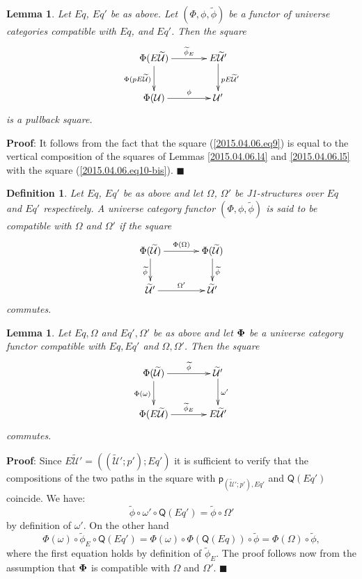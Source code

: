 \documentclass[12pt]{article}
\numberwithin{equation}{section}
\newenvironment{eq}{\begin{equation}}{\end{equation}}
\newenvironment{myproof}{{\bf Proof}:}{$\blacksquare$ \vskip 5mm }
\newtheorem{lemma}[proposition]{Lemma}
\newtheorem{definition}[proposition]{Definition}
\newcommand{\wt}{\widetilde}
\newcommand{\p}{\mathsf{p}}
\newcommand{\U}{\mathcal{U}}
\newcommand{\Q}{\mathsf{Q}}
\begin{document}
%
\begin{lemma}
\label{2015.04.06.l6} Let $Eq$, $Eq'$ be as above. Let $(\Phi,\phi,\wt{\phi})$
be a functor of universe categories compatible with $Eq$, and $Eq'$. Then the
square
%
\begin{eq}\label{2015.04.06.eq9}
\begin{xy}
          \xymatrix@C=3pc{ \Phi(E\wt{\U}) \ar[r]^-{\wt{\phi}_{E}}
            \ar[d]_{\Phi(pE\wt{\U})} & E\wt{\U}' \ar[d]^{pE\wt{\U}'}\\ \Phi(\U)
            \ar[r]^-{\phi} & \U' }
\end{xy}
\end{eq}%
%
is a pullback square.
%
\end{lemma} 
%
\begin{myproof}
It follows from the fact that the square (\ref{2015.04.06.eq9}) is equal to the
vertical composition of the squares of Lemmas \ref{2015.04.06.l4} and
\ref{2015.04.06.l5} with the square (\ref{2015.04.06.eq10-bis}).
\end{myproof}
%


\begin{definition}
\label{2015.04.06.def5} Let $Eq$, $Eq'$ be as above and let $\Omega$,
$\Omega'$ be J1-structures over $Eq$ and $Eq'$ respectively. A universe
category functor $(\Phi,\phi,\wt{\phi})$ is said to be compatible with $\Omega$
and $\Omega'$ if the square
%
$$
\begin{xy}
          \xymatrix@C=3pc{ \Phi(\wt{\U}) \ar[r]^-{\Phi(\Omega)}
            \ar[d]_{\wt{\phi}} & \Phi(\wt{\U})\ar[d]^{\wt{\phi}}\\ \wt{\U}'
            \ar[r]^-{\Omega'} & \wt{\U}' }
\end{xy}
$$
%
commutes.
\end{definition}
%
\begin{lemma}
\label{2015.04.10.l7} Let $Eq,\Omega$ and $Eq',\Omega'$ be as above and let
${\bf\Phi}$ be a universe category functor compatible with $Eq,Eq'$ and
$\Omega,\Omega'$. Then the square
%
$$
\begin{xy}
          \xymatrix@C=3pc{ \Phi(\wt{\U}) \ar[r]^-{\wt{\phi}}
            \ar[d]_{\Phi(\omega)} & \wt{\U}'\ar[d]^-{\omega'}\\ \Phi(E\wt{\U})
            \ar[r]^-{\wt{\phi}_{E}} & E\wt{\U}' }
\end{xy}
$$
%
commutes.
\end{lemma}
%
\begin{myproof}
Since $E\wt{\U}'=((\wt{\U}';p');Eq')$ it is sufficient to verify that the
compositions of the two paths in the square with $\p_{(\wt{\U}';p'),Eq'}$ and
$\Q(Eq')$ coincide. We have:
%
$$\wt{\phi}\circ\omega'\circ \Q(Eq')=\wt{\phi}\circ\Omega'$$
%
by definition of $\omega'$. On the other hand
%
$$\Phi(\omega)\circ \wt{\phi}_{E}\circ \Q(Eq')=\Phi(\omega)\circ
\Phi(\Q(Eq))\circ \wt{\phi}=\Phi(\Omega)\circ\wt{\phi},$$
%
where the first equation holds by definition of $\wt{\phi}_{E}$. The proof
follows now from the assumption that ${\bf\Phi}$ is compatible with $\Omega$
and $\Omega'$.
\end{myproof}
%
\end{document}
